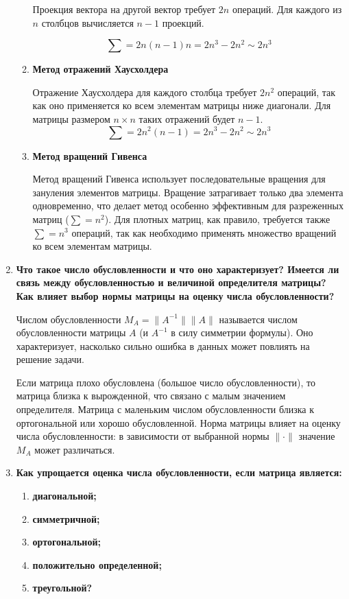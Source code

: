 \documentclass[12pt, a4paper]{article}
\begin{document}
\begin{enumerate}
\begin{enumerate}
		Проекция вектора на другой вектор требует $2n$ операций. Для каждого из $n$ столбцов вычисляется $n-1$ проекций.
		
		$$\sum = 2n (n-1) n = 2n^3 - 2n^2 \sim 2n^3$$
		
		\item \textbf{ Метод отражений Хаусхолдера}
		
		Отражение Хаусхолдера для каждого столбца требует $2n^2$ операций, так как оно применяется ко всем элементам матрицы ниже диагонали. Для матрицы размером $n \times n$ таких отражений будет $n-1$.
		$$\sum = 2n^2 (n-1) = 2n^3 - 2n^2 \sim 2n^3$$
		\item \textbf{ Метод вращений Гивенса}
		
		Метод вращений Гивенса использует последовательные вращения для зануления элементов матрицы. Вращение затрагивает только два элемента одновременно, что делает метод особенно эффективным для разреженных матриц ($\sum = n^2$). Для плотных матриц, как правило, требуется также $\sum = n^3$ операций, так как необходимо применять множество вращений ко всем элементам матрицы.
	\end{enumerate}



	\item \textbf{Что такое число обусловленности и что оно характеризует?
	Имеется ли связь между обусловленностью и величиной
	определителя матрицы? Как влияет выбор нормы матрицы
	на оценку числа обусловленности?}
	
		Числом обусловленности $M_{A}=\|A^{-1}\| \|A\|$ называется числом обусловленности матрицы $A$ (и $A^{-1}$ в силу симметрии формулы). Оно характеризует, насколько сильно ошибка в данных может повлиять на решение задачи.
		
		Если матрица плохо обусловлена (большое число обусловленности), то матрица близка к вырожденной, что связано с малым значением определителя.
		Матрица с маленьким числом обусловленности близка к ортогональной или хорошо обусловленной.
		Норма матрицы влияет на оценку числа обусловленности: в зависимости от выбранной нормы $\|\cdot\|$ значение $M_{A}$ может различаться.
	
	\item  \textbf{Как упрощается оценка числа обусловленности, если матрица является:}
	\begin{enumerate}
		\item \textbf{ диагональной;}
		\item \textbf{ симметричной;}
		\item \textbf{ ортогональной;}
		\item \textbf{  положительно определенной;}
		\item \textbf{ треугольной?}
	\end{enumerate}


\end{enumerate}
\end{document}
